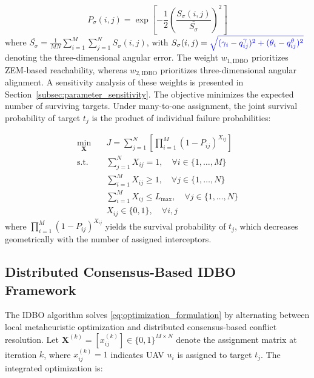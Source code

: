 \documentclass[lettersize,journal]{IEEEtran}
\newcommand{\hladd}[1]{{\color{blue}#1}}
\begin{document}
\begin{equation}
\label{eq:angular_prob}
P_{\sigma}(i,j) = \exp\left[-\frac{1}{2}\left(\frac{S_{\sigma}(i,j)}{\overline{S_{\sigma}}}\right)^2\right]
\end{equation}
where $\overline{S_{\sigma}} = \frac{1}{MN}\sum_{i=1}^{M}\sum_{j=1}^{N} S_{\sigma}(i,j)$, with $S_{\sigma}(i,j) = \hladd{\sqrt{(\gamma_i - q_{ij}^{\gamma})^2 + (\theta_i - q_{ij}^{\theta})^2}}$ denoting the \hladd{three-dimensional} angular error. 
\hladd{The weight $w_{1,\mathrm{IDBO}}$ prioritizes ZEM-based reachability, whereas $w_{2,\mathrm{IDBO}}$ prioritizes three-dimensional angular alignment. A sensitivity analysis of these weights is presented in Section~\ref{subsec:parameter_sensitivity}.}
The objective minimizes the expected number of surviving targets. Under many-to-one assignment, the joint survival probability of target $t_j$ is the product of individual failure probabilities:

\begin{equation}
\label{eq:optimization_formulation}
\begin{aligned}
\min_{\mathbf{X}} \quad & J = \sum_{j=1}^{N} \left[ \prod_{i=1}^{M} \left(1 - P_{ij}\right)^{X_{ij}} \right] \\
\text{s.t.} \quad & \sum_{j=1}^{N} X_{ij} = 1, \quad \forall i \in \{1,\dots,M\} \\
& \sum_{i=1}^{M} X_{ij} \geq 1, \quad \forall j \in \{1,\dots,N\} \\
& \sum_{i=1}^{M} X_{ij} \leq L_{\max}, \quad \forall j \in \{1,\dots,N\} \\
& X_{ij} \in \{0,1\}, \quad \forall i,j
\end{aligned}
\end{equation}
where $\prod_{i=1}^{M} (1 - P_{ij})^{X_{ij}}$ yields the survival probability of $t_j$, which decreases geometrically with the number of assigned interceptors.


\subsection{Distributed Consensus-Based IDBO Framework}
\label{subsec:idbo_algorithm}

The IDBO algorithm solves \eqref{eq:optimization_formulation} by alternating between local metaheuristic optimization and distributed consensus-based conflict resolution. Let $\mathbf{X}^{(k)} = [x_{ij}^{(k)}] \in \{0,1\}^{M \times N}$ denote the assignment matrix at iteration $k$, where $x_{ij}^{(k)}=1$ indicates UAV $u_i$ is assigned to target $t_j$. The integrated optimization is:
\end{document}
